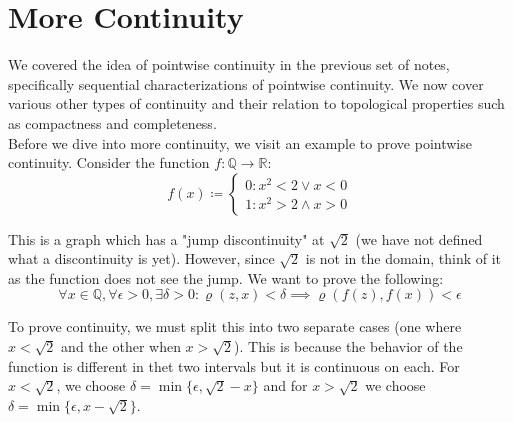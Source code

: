 \documentclass{exam}
\author{Omkar Tasgaonkar}
\begin{document}
\thispagestyle{firstpage}

\section*{More Continuity}
We covered the idea of pointwise continuity in the previous set of notes, specifically sequential characterizations of pointwise continuity. We now cover various other types of continuity and their relation to topological properties such as compactness and completeness.\\

Before we dive into more continuity, we visit an example to prove pointwise continuity. Consider the function $f: \mathbb{Q} \xrightarrow{} \mathbb{R}$:
\begin{equation}
  f(x) \coloneq \begin{cases*}
    0 : x^2 < 2 \lor x < 0\\
    1 : x^2 > 2 \land x > 0
  \end{cases*}
\end{equation}

This is a graph which has a "jump discontinuity" at $\sqrt{2}$ (we have not defined what a discontinuity is yet). However, since $\sqrt{2}$ is not in the domain, think of it as the function does not see the jump. We want to prove the following:
\begin{equation*}
  \forall x \in \mathbb{Q}, \forall \epsilon > 0, \exists \delta > 0: \varrho(z, x) < \delta \implies \varrho(f(z), f(x)) < \epsilon
\end{equation*}

To prove continuity, we must split this into two separate cases (one where $x < \sqrt{2}$ and the other when $x > \sqrt{2}$). This is because the behavior of the function is different in thet two intervals but it is continuous on each. For $x < \sqrt{2}$, we choose $\delta = \min\{\epsilon, \sqrt{2} - x\}$ and for $x > \sqrt{2}$ we choose $\delta = \min\{\epsilon, x - \sqrt{2}\}$.\\ 
\end{document}

